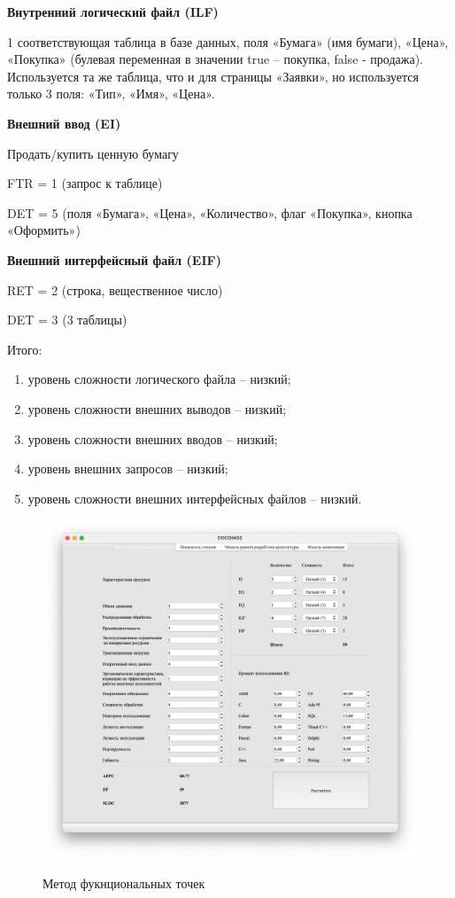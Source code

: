 \textbf{Внутренний логический файл (ILF)}

1 соответствующая таблица в базе данных, поля «Бумага» (имя бумаги), «Цена», «Покупка» (булевая переменная в значении true – покупка, false - продажа).
Используется та же таблица, что и для страницы «Заявки», но используется только 3 поля: «Тип», «Имя», «Цена».

\textbf{Внешний ввод (EI)}

Продать/купить ценную бумагу

FTR = 1 (запрос к таблице)

DET = 5 (поля «Бумага», «Цена», «Количество», флаг «Покупка», кнопка «Оформить»)

\textbf{Внешний интерфейсный файл (EIF)}

RET = 2 (строка, вещественное число)

DET = 3 (3 таблицы)

Итого:

\begin{enumerate}
	\item уровень сложности логического файла – низкий;
	\item уровень сложности внешних выводов – низкий;
	\item уровень сложности внешних вводов – низкий;
	\item уровень внешних запросов – низкий;
	\item уровень сложности внешних интерфейсных файлов – низкий.
\end{enumerate}

\begin{figure}[ht!]
	\includegraphics[width=1\linewidth]{assets/images/2.1.png}
	\label{fig:r2}
	\caption{Метод фукнциональных точек}
\end{figure}
\FloatBarrier

